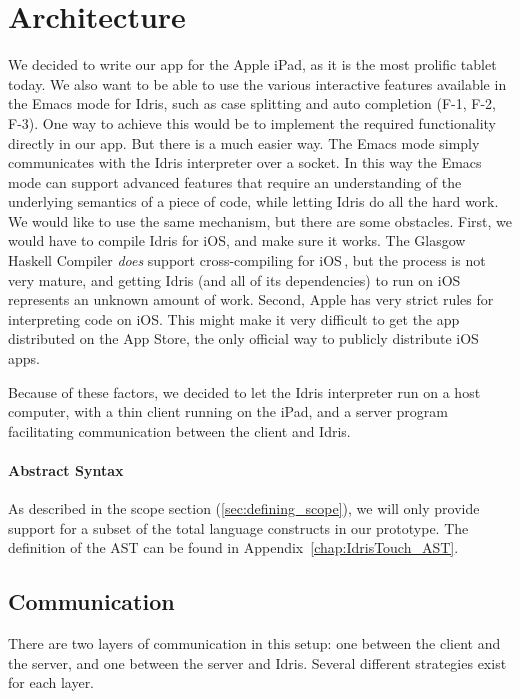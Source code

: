 \chapter{Architecture}
\label{sec:Architecture}

We decided to write our app for the Apple iPad, as it is the most prolific
tablet today. We also want to be able to use the various interactive features
available in the Emacs mode for Idris, such as case
splitting and auto completion (F-1, F-2, F-3). One way to achieve this would be to implement
the required functionality directly in our app. But there is a much easier way.
The Emacs mode simply communicates with the Idris interpreter over a socket. 
In this way the Emacs mode can support advanced features that require an
understanding of the underlying semantics of a piece of code, while letting
Idris do all the hard work. We would like to use the same mechanism, but there
are some obstacles. First, we would have to compile Idris for iOS, and make 
sure it works. The Glasgow Haskell Compiler \emph{does} support 
cross-compiling for iOS\,\cite{ghc_ios_crosscompiler}, but the process is not very mature, and
getting Idris (and all of its dependencies) to run on iOS represents an 
unknown amount of work. Second, Apple has very strict rules for interpreting
code on iOS\@. This might make it very difficult to get the app distributed on
the App Store, the only official way to publicly distribute iOS apps.

Because of these factors, we decided to let the Idris interpreter run on a 
host computer, with a thin client running on the iPad, and a server program 
facilitating communication between the client and Idris.

\subsubsection{Abstract Syntax}
As described in the scope section (\ref{sec:defining_scope}), we will only
provide support for a subset of the total language constructs in our prototype.
The definition of the AST can be found in Appendix~\ref{chap:IdrisTouch_AST}.


\section{Communication}
There are two layers of communication in this setup: one between the client and
the server, and one between the server and Idris. Several different strategies
exist for each layer. 

